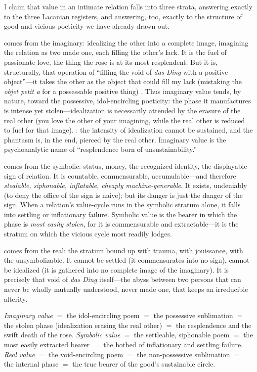 I claim that value in an intimate relation falls into three strata, answering exactly to the three Lacanian registers, and answering, too, exactly to the structure of good and vicious poeticity we have already drawn out.

 comes from the imaginary: idealizing the other into a complete image, imagining the relation as two made one, each filling the other's lack. It is the fuel of passionate love, the thing the rose is at its most resplendent. But it is, structurally, that operation of ``filling the void of \emph{das Ding} with a positive object''---it takes the other as the object that could fill my lack (mistaking the \emph{objet petit a} for a possessable positive thing) \parencite{lacan2006}. Thus imaginary value tends, by nature, toward the possessive, idol-encircling poeticity: the phase it manufactures is intense yet stolen---idealization is necessarily attended by the erasure of the real other (you love the other of your imagining, while the real other is reduced to fuel for that image). : the intensity of idealization cannot be sustained, and the phantasm is, in the end, pierced by the real other. Imaginary value is the psychoanalytic name of ``resplendence born of unsustainability.''

 comes from the symbolic: status, money, the recognized identity, the displayable sign of relation. It is countable, commensurable, accumulable---and therefore \emph{stealable, siphonable, inflatable, cheaply machine-generable}. It exists, undeniably (to deny the office of the sign is naive); but its danger is just the danger of the sign. When a relation's value-cycle runs in the symbolic stratum alone, it falls into settling or inflationary failure. Symbolic value is the bearer in which the phase is \emph{most easily stolen}, for it is commensurable and extractable---it is the stratum on which the vicious cycle most readily lodges.

 comes from the real: the stratum bound up with trauma, with jouissance, with the unsymbolizable. It cannot be settled (it commensurates into no sign), cannot be idealized (it is gathered into no complete image of the imaginary). It is precisely that void of \emph{das Ding} itself---the abyss between two persons that can never be wholly mutually understood, never made one, that keeps an irreducible alterity.

\begin{claim}
\emph{Imaginary value} $=$ the idol-encircling poem $=$ the possessive sublimation $=$ the stolen phase (idealization erasing the real other) $=$ the resplendence and the swift death of the rose. \emph{Symbolic value} $=$ the settleable, siphonable poem $=$ the most easily extracted bearer $=$ the hotbed of inflationary and settling failure. \emph{Real value} $=$ the void-encircling poem $=$ the non-possessive sublimation $=$ the internal phase $=$ the true bearer of the good's sustainable circle.
\end{claim}


